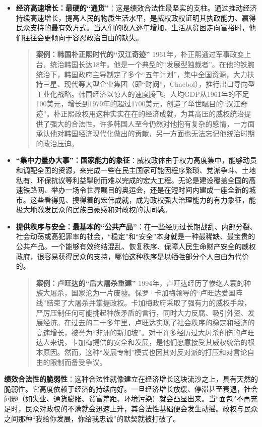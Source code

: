 \begin{itemize}
    \item \textbf{经济高速增长：最硬的“通货”}：这是绩效合法性最坚实的支柱。通过推动经济持续高速增长，提高人民的物质生活水平，是威权政权证明其执政能力、赢得民众支持的最有效方式。当人们的收入逐年增加，生活从贫困走向富裕时，他们往往会更倾向于容忍政治自由的缺失。
    \begin{quote}
    \textbf{案例：韩国朴正熙时代的“汉江奇迹”}
    1961年，朴正熙通过军事政变上台，统治韩国长达18年。他是一个典型的“发展型独裁者”。在他的铁腕统治下，韩国政府主导制定了多个“五年计划”，集中全国资源，大力扶持三星、现代等大型企业集团（即“财阀”，Chaebol），推行出口导向型工业化战略。韩国经济以惊人的速度腾飞，人均GDP从1961年的不足100美元，增长到1979年的超过1700美元，创造了举世瞩目的“汉江奇迹”。朴正熙政权用这种实实在在的经济成就，为其高压的威权统治提供了强大的合法性。许多韩国人至今仍然对他抱有复杂的感情，一方面承认他对韩国经济现代化做出的贡献，另一方面也无法忘记他统治时期的政治压迫。
    \end{quote}
    \item \textbf{“集中力量办大事”：国家能力的象征}：威权政体由于权力高度集中，能够动员和调配全国的资源，来完成一些在民主国家可能因程序繁琐、党派争斗、土地私有、环保抗议等利益掣肘而难以完成的宏大工程。无论是建设覆盖全国的高速铁路网、举办一场令世界瞩目的奥运会，还是在短时间内建成一座全新的城市。这些看得见、摸得着的宏伟成就，成为政权强大治理能力的有力象征，能极大地激发民众的民族自豪感和对政权的认同感。
    \item \textbf{提供秩序与安全：最基本的“公共产品”}：在一些经历过长期战乱、内部分裂、社会动荡或高犯罪率的社会，“稳定”和“安全”本身就是一种最稀缺、最宝贵的公共产品。一个能够有效终结混乱、恢复秩序、保障人民生命财产安全的威权政府，很容易获得民众的支持，哪怕这种秩序是以牺牲部分个人自由为代价的。
    \begin{quote}
    \textbf{案例：卢旺达的“后大屠杀重建”}
    1994年，卢旺达经历了惨绝人寰的种族大屠杀，国家沦为一片废墟。保罗·卡加梅领导的“卢旺达爱国阵线”结束了大屠杀并掌握政权。卡加梅政府采取了强有力的威权手段，严厉压制任何可能挑起种族矛盾的言行，同时大力反腐、吸引外资、发展经济。在过去的二十多年里，卢旺达实现了社会秩序的稳定和经济的高速增长，被誉为“非洲的新加坡”。对于许多经历过大屠杀创伤的卢旺达人来说，卡加梅提供的安全和发展，是他们愿意接受其威权统治的根本原因。然而，这种“发展专制”模式也因其对反对派的打压和对言论自由的限制而备受争议。
    \end{quote}
\end{itemize}

\textbf{绩效合法性的脆弱性}：这种合法性就像建立在经济增长这块流沙之上，具有天然的脆弱性。它高度依赖于经济的持续向好。一旦经济增长放缓、停滞甚至衰退，社会问题（如失业、通货膨胀、贫富差距、环境污染）就会凸显出来。当“面包”不再充足时，民众对政权的不满就会迅速上升，其合法性基础便会发生动摇。政权与民众之间那种“我给你发展，你给我忠诚”的默契就被打破了。

